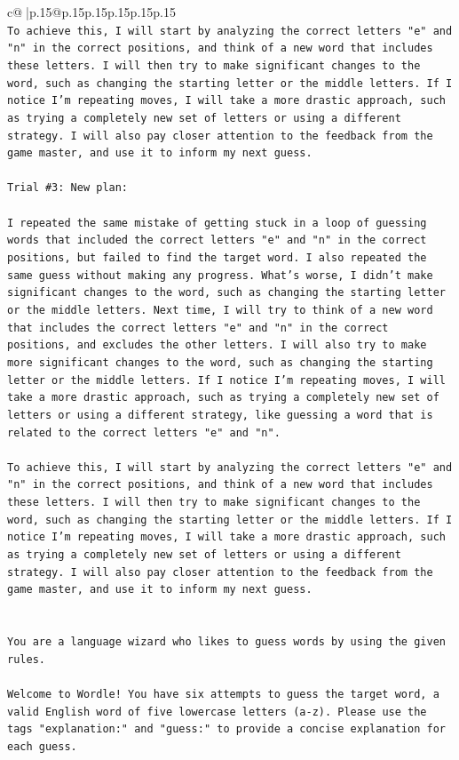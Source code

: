 \documentclass{article}
\begin{document}
{\begin{supertabular}{c@{$\;$}|p{.15\linewidth}@{}p{.15\linewidth}p{.15\linewidth}p{.15\linewidth}p{.15\linewidth}p{.15\linewidth}}
{{{\\ 
\texttt{To achieve this, I will start by analyzing the correct letters "e" and "n" in the correct positions, and think of a new word that includes these letters. I will then try to make significant changes to the word, such as changing the starting letter or the middle letters. If I notice I'm repeating moves, I will take a more drastic approach, such as trying a completely new set of letters or using a different strategy. I will also pay closer attention to the feedback from the game master, and use it to inform my next guess.} \\
\\ 
\texttt{Trial \#3: New plan: } \\
\\ 
\texttt{I repeated the same mistake of getting stuck in a loop of guessing words that included the correct letters "e" and "n" in the correct positions, but failed to find the target word. I also repeated the same guess without making any progress. What's worse, I didn't make significant changes to the word, such as changing the starting letter or the middle letters. Next time, I will try to think of a new word that includes the correct letters "e" and "n" in the correct positions, and excludes the other letters. I will also try to make more significant changes to the word, such as changing the starting letter or the middle letters. If I notice I'm repeating moves, I will take a more drastic approach, such as trying a completely new set of letters or using a different strategy, like guessing a word that is related to the correct letters "e" and "n". } \\
\\ 
\texttt{To achieve this, I will start by analyzing the correct letters "e" and "n" in the correct positions, and think of a new word that includes these letters. I will then try to make significant changes to the word, such as changing the starting letter or the middle letters. If I notice I'm repeating moves, I will take a more drastic approach, such as trying a completely new set of letters or using a different strategy. I will also pay closer attention to the feedback from the game master, and use it to inform my next guess.} \\
\\ 
\\ 
\texttt{You are a language wizard who likes to guess words by using the given rules.} \\
\\ 
\texttt{Welcome to Wordle! You have six attempts to guess the target word, a valid English word of five lowercase letters (a{-}z). Please use the tags "explanation:" and "guess:" to provide a concise explanation for each guess.} \\
}}}
\end{supertabular}}
\end{document}
